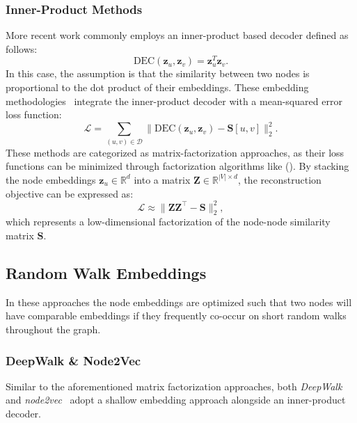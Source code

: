 \subsubsection{Inner-Product Methods}
More recent work commonly employs an inner-product based decoder defined as follows:
\begin{equation}\label{eq:innerProductDec}
    \text{DEC}(\mathbf{z}_u, \mathbf{z}_v) = \mathbf{z}_u^T\mathbf{z}_v.
\end{equation}
In this case, the assumption is that the similarity between two nodes is proportional to the dot product of their embeddings. These embedding methodologies~\cite{Ahmed2013distributedLargeScaleNaturalGraphFactorization}\cite{Cao2015grarep}\cite{Ou2016asymmetricTransitivityPreservingGraphEmbedding} integrate the inner-product decoder with a mean-squared error loss function:
\begin{equation*}
    \mathcal{L} = \sum_{(u,v)\in\mathcal{D}} \|\text{DEC}(\mathbf{z}_u, \mathbf{z}_v) - \textbf{S}[u,v]\|_2^2.
\end{equation*}
These methods are categorized as matrix-factorization approaches, as their loss functions can be minimized through factorization algorithms like  (). By stacking the node embeddings $ \mathbf{z}_u \in \mathbb{R}^d $ into a matrix $ \mathbf{Z} \in \mathbb{R}^{|V|\times d} $, the reconstruction objective can be expressed as:
\begin{equation*}
    \mathcal{L} \approx \|\mathbf{Z}\mathbf{Z}^\top - \textbf{S}\|_2^2,
\end{equation*}
which represents a low-dimensional factorization of the node-node similarity matrix $ \textbf{S} $. 

\subsection{Random Walk Embeddings}
In these approaches the node embeddings are optimized such that two nodes will have comparable embeddings if they frequently co-occur on short random walks throughout the graph.

\subsubsection{DeepWalk \& Node2Vec}
Similar to the aforementioned matrix factorization approaches, both \textit{DeepWalk}~\cite{Perozzi2014DeepWalk} and \textit{node2vec}~\cite{Grover2016node2vec} adopt a shallow embedding approach alongside an inner-product decoder.

